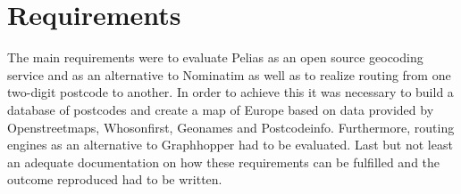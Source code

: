 
\section{Requirements}
The main requirements were to evaluate Pelias as an open source geocoding service and as an alternative to Nominatim as well as to realize routing from one two-digit postcode to another. In order to achieve this it was necessary to build a database of postcodes and create a map of Europe based on data provided by Openstreetmaps, Whosonfirst, Geonames and Postcodeinfo. Furthermore, routing engines as an alternative to Graphhopper had to be evaluated. Last but not least an adequate documentation on how these requirements can be fulfilled and the outcome reproduced had to be written.